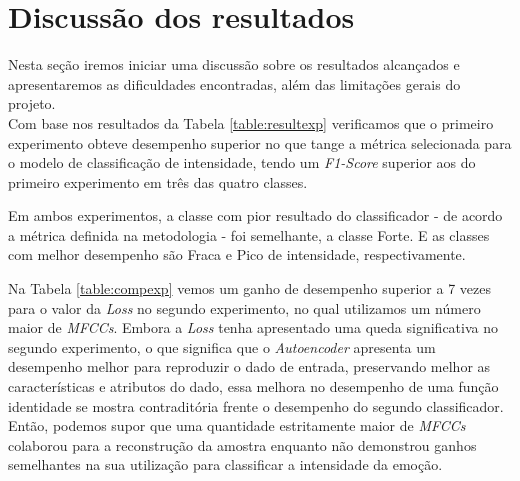 


\clearpage

\section{Discussão dos resultados}

Nesta seção iremos iniciar uma discussão sobre os resultados alcançados e apresentaremos as dificuldades encontradas, além das limitações gerais do projeto.\\

Com base nos resultados da Tabela \ref{table:resultexp} verificamos que o primeiro experimento obteve desempenho superior no que tange a métrica selecionada para o modelo de classificação de intensidade, tendo um \textit{F1-Score} superior aos do primeiro experimento em três das quatro classes.

Em ambos experimentos, a classe com pior resultado do classificador - de acordo a métrica definida na metodologia - foi semelhante, a classe Forte. E as classes com melhor desempenho são Fraca e Pico de intensidade, respectivamente.

Na Tabela \ref{table:compexp} vemos um ganho de desempenho superior a 7 vezes para o valor da \textit{Loss} no segundo experimento, no qual utilizamos um número maior de \textit{MFCCs}. Embora a \textit{Loss} tenha apresentado uma queda significativa no segundo experimento, o que significa que o \textit{Autoencoder} apresenta um desempenho melhor para reproduzir o dado de entrada, preservando melhor as características e atributos do dado, essa melhora no desempenho de uma função identidade se mostra contraditória frente o desempenho do segundo classificador. Então, podemos supor que uma quantidade estritamente maior de \textit{MFCCs} colaborou para a reconstrução da amostra enquanto não demonstrou ganhos semelhantes na sua utilização para classificar a intensidade da emoção.


